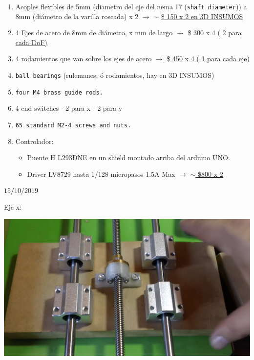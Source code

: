 \documentclass[12pt,dvipsnames]{exam}
\begin{document}
\begin{enumerate}
\item Acoples flexibles de 5mm (diametro del eje del nema 17 (\texttt{shaft diameter})) a 8mm (diámetro de la varilla roscada) x 2 $\xrightarrow{}$ $\sim$ \href{https://3dinsumos.com.ar/Producto/3DPrinter-AcopleAlu5-8}{\$ 150 x 2 en 3D INSUMOS}
\item 4 Ejes de acero de 8mm de diámetro, x mm de largo $\xrightarrow{}$ \href{https://3dinsumos.com.ar/Producto/3DPrinter-Varilla8mmX320mm}{\$ 300 x 4 ( 2 para cada DoF)}
\item 4 rodamientos que van sobre los ejes de acero $\xrightarrow{}$ \href{https://3dinsumos.com.ar/Producto/3DPrinter-Rul-SCS8UU-ConSoporte}{\$ 450 x 4 ( 1 para cada eje)}
\item \texttt{ball bearings} (rulemanes, ó rodamientos, hay en 3D INSUMOS)
\item \texttt{four M4 brass guide rods.}
\item 4 end switches - 2 para x - 2 para y
\item \texttt{65 standard M2-4 screws and
nuts.}
	\item Controlador: \begin{itemize}
\item Puente H L293DNE en un shield montado arriba del arduino UNO.
\item 	Driver LV8729 hasta 1/128 micropasos 1.5A Max $\xrightarrow{}$ \href{https://3dinsumos.com.ar/Producto/3DPrinter-DriverLV8729}{$\sim$ \$800 x 2}
	\end{itemize}
\end{enumerate}

\newpage

\hrulefill

$15/10/2019$


Eje x:

\begin{center}
	\includegraphics[scale=0.8]{imgs/eje_x.png}
\end{center}
\end{document}

